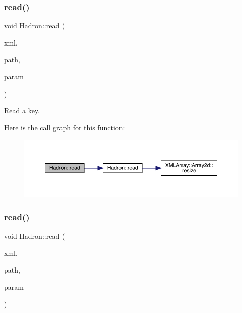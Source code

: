\subsubsection{\texorpdfstring{read()}{read()}\hspace{0.1cm}{\footnotesize\ttfamily [30/94]}}
{\footnotesize\ttfamily void Hadron\+::read (\begin{DoxyParamCaption}\item[{\mbox{\hyperlink{classADATXML_1_1XMLReader}{X\+M\+L\+Reader}} \&}]{xml,  }\item[{const std\+::string \&}]{path,  }\item[{\mbox{\hyperlink{structHadron_1_1KeyGenPropElementalOperator__t}{Key\+Gen\+Prop\+Elemental\+Operator\+\_\+t}} \&}]{param }\end{DoxyParamCaption})}



Read a key. 

Here is the call graph for this function\+:
\nopagebreak
\begin{figure}[H]
\begin{center}
\leavevmode
\includegraphics[width=350pt]{d1/daf/namespaceHadron_a9c6649bbe7b32cbc5fcbf8ebbf17d987_cgraph}
\end{center}
\end{figure}
\mbox{\label{namespaceHadron_a35b28e298745916c37daa929a874e099}} 
\subsubsection{\texorpdfstring{read()}{read()}\hspace{0.1cm}{\footnotesize\ttfamily [31/94]}}
{\footnotesize\ttfamily void Hadron\+::read (\begin{DoxyParamCaption}\item[{\mbox{\hyperlink{classADATXML_1_1XMLReader}{X\+M\+L\+Reader}} \&}]{xml,  }\item[{const std\+::string \&}]{path,  }\item[{\mbox{\hyperlink{structHadron_1_1KeySingleHadronQuarkSpin__t}{Key\+Single\+Hadron\+Quark\+Spin\+\_\+t}} \&}]{param }\end{DoxyParamCaption})}

